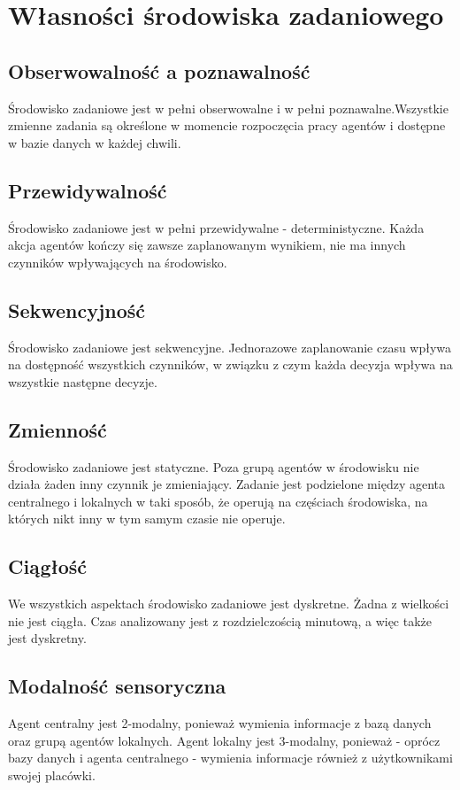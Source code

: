 \section{Własności środowiska zadaniowego}
\subsection{Obserwowalność a poznawalność}
Środowisko zadaniowe jest w pełni obserwowalne i w pełni poznawalne.Wszystkie zmienne zadania są określone w momencie
 rozpoczęcia pracy agentów i dostępne w bazie danych w każdej chwili.
 
\subsection{Przewidywalność}
Środowisko zadaniowe jest w pełni przewidywalne - deterministyczne. Każda akcja agentów kończy się zawsze zaplanowanym
 wynikiem, nie ma innych czynników wpływających na środowisko.

\subsection{Sekwencyjność}
Środowisko zadaniowe jest sekwencyjne. Jednorazowe zaplanowanie czasu wpływa na dostępność wszystkich czynników,
w związku z czym każda decyzja wpływa na wszystkie następne decyzje.

\subsection{Zmienność}
Środowisko zadaniowe jest statyczne. Poza grupą agentów w środowisku nie działa żaden inny czynnik je zmieniający.
Zadanie jest podzielone między agenta centralnego i lokalnych w taki sposób, że operują na częściach środowiska, na których
nikt inny w tym samym czasie nie operuje.

\subsection{Ciągłość}
We wszystkich aspektach środowisko zadaniowe jest dyskretne. Żadna z wielkości nie jest ciągła. Czas analizowany jest
z rozdzielczością minutową, a więc także jest dyskretny.

\subsection{Modalność sensoryczna}
Agent centralny jest 2-modalny, ponieważ wymienia informacje z bazą danych oraz grupą agentów lokalnych.
Agent lokalny jest 3-modalny, ponieważ - oprócz bazy danych i agenta centralnego - wymienia informacje również
z użytkownikami swojej placówki.

